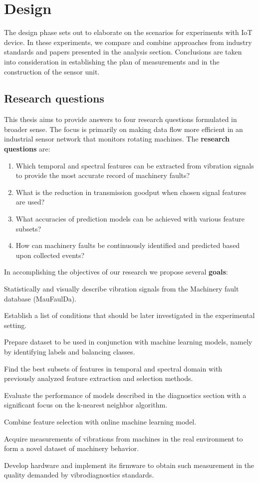 \chapter{Design} \label{section:design}
The design phase sets out to elaborate on the scenarios for experiments with IoT device. In these experiments, we compare and combine approaches from industry standards and papers presented in the analysis section. Conclusions are taken into consideration in establishing the plan of measurements and in the construction of the sensor unit.

\section{Research questions}
This thesis aims to provide answers to four research questions formulated in broader sense. The focus is primarily on making data flow more efficient in an industrial sensor network that monitors rotating machines. The \textbf{research questions} are:
\begin{enumerate}[label=RQ\arabic*., font=\bfseries]
    \itemsep0pt
	\item Which temporal and spectral features can be extracted from vibration signals to provide the most accurate record of machinery faults?
	\item What is the reduction in transmission goodput when chosen signal features are used?
	\item What accuracies of prediction models can be achieved with various feature subsets?
	\item How can machinery faults be continuously identified and predicted based upon collected events?
\end{enumerate}

\noindent In accomplishing the objectives of our research we propose several \textbf{goals}:
\begin{todolist}
    \itemsep0pt
	\item Statistically and visually describe vibration signals from the Machinery fault database (MauFaulDa).
	\item Establish a list of conditions that should be later investigated in the experimental setting.
	\item Prepare dataset to be used in conjunction with machine learning models, namely by identifying labels and balancing classes.
	\item Find the best subsets of features in temporal and spectral domain with previously analyzed feature extraction and selection methods.
	\item Evaluate the performance of models described in the diagnostics section with a significant focus on the k-nearest neighbor algorithm.
	\item Combine feature selection with online machine learning model.
	\item Acquire measurements of vibrations from machines in the real environment to form a novel dataset of machinery behavior.
	\item Develop hardware and implement its firmware to obtain such measurement in the quality demanded by vibrodiagnostics standards.
\end{todolist}

